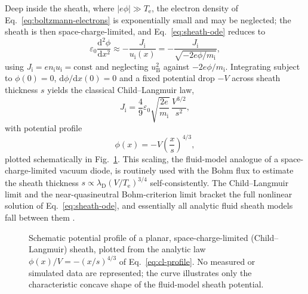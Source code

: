 Deep inside the sheath, where $|e\phi|\gg T_{\mathrm{e}}$, the electron density of Eq.~\eqref{eq:boltzmann-electrons} is exponentially small and may be neglected; the sheath is then space-charge-limited, and Eq.~\eqref{eq:sheath-ode} reduces to
\begin{equation}
\varepsilon_0\frac{\mathrm{d}^2\phi}{\mathrm{d}x^2} \approx -\frac{J_{\mathrm{i}}}{u_{\mathrm{i}}(x)} = -\frac{J_{\mathrm{i}}}{\sqrt{-2e\phi/m_{\mathrm{i}}}},
\end{equation}
using $J_{\mathrm{i}}=en_{\mathrm{i}}u_{\mathrm{i}}=\mathrm{const}$ and neglecting $u_{\mathrm{B}}^2$ against $-2e\phi/m_{\mathrm{i}}$. Integrating subject to $\phi(0)=0$, $\mathrm{d}\phi/\mathrm{d}x(0)=0$ and a fixed potential drop $-V$ across sheath thickness $s$ yields the classical Child--Langmuir law,
\begin{equation}
J_{\mathrm{i}} = \frac{4}{9}\varepsilon_0\sqrt{\frac{2e}{m_{\mathrm{i}}}}\,\frac{V^{3/2}}{s^2},
\label{ch12-eq:child-langmuir}
\end{equation}
with potential profile
\begin{equation}
\phi(x) = -V\left(\frac{x}{s}\right)^{4/3},
\label{eq:cl-profile}
\end{equation}
plotted schematically in Fig.~\ref{fig:cl-profile}. This scaling, the fluid-model analogue of a space-charge-limited vacuum diode, is routinely used with the Bohm flux to estimate the sheath thickness $s\propto\lambda_{\mathrm{D}}(V/T_{\mathrm{e}})^{3/4}$ self-consistently. The Child--Langmuir limit and the near-quasineutral Bohm-criterion limit bracket the full nonlinear solution of Eq.~\eqref{eq:sheath-ode}, and essentially all analytic fluid sheath models fall between them \cite{ref0090,ref0083}.

\begin{figure}[htbp]
\centering
{}
\caption{Schematic potential profile of a planar, space-charge-limited (Child--Langmuir) sheath, plotted from the analytic law $\phi(x)/V=-(x/s)^{4/3}$ of Eq.~\eqref{eq:cl-profile}. No measured or simulated data are represented; the curve illustrates only the characteristic concave shape of the fluid-model sheath potential.}
\label{fig:cl-profile}
\end{figure}

